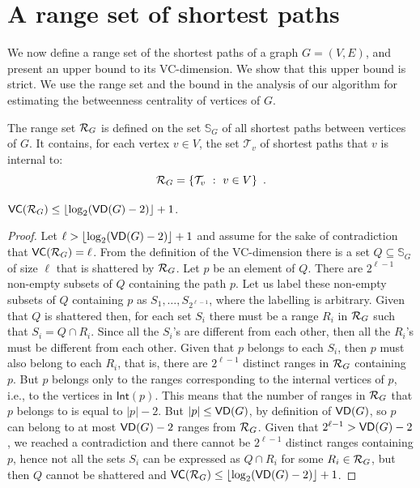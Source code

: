 \section{A range set of shortest paths}\label{sec:rangeset}
We now define a range set of the shortest paths of a graph $G=(V,E)$, and present 
an upper bound to its VC-dimension. We show that this upper bound is strict. We
use the range set and the bound in the analysis of our algorithm for estimating
the betweenness centrality of vertices of $G$.

The range set $\mathcal{R}_G$ is defined on the set $\mathbb{S}_G$ of all shortest
paths between vertices of $G$. It contains, for each vertex $v\in V$, the set
$\mathcal{T}_v$ of shortest paths that $v$ is internal to:
\[
\mathcal{R}_G = \{\mathcal{T}_v ~:~ v\in V\}\enspace.
\]

\begin{lemma}\label{lem:vcdimuppbound}
  $\mathsf{VC}(\mathcal{R}_G)\le\lfloor\log_2(\mathsf{VD}(G)-2)\rfloor+1$.
\end{lemma}

\begin{proof}
Let $\ell>\lfloor\log_2(\mathsf{VD}(G)-2)\rfloor+1$ and assume for the sake of contradiction
that $\mathsf{VC}(\mathcal{R}_G)=\ell$. From the definition of the VC-dimension there is a set
$Q\subseteq\mathbb{S}_G$ of size $\ell$ that is shattered by $\mathcal{R}_G$. Let $p$ be
an element of $Q$. There are  $2^{\ell-1}$ non-empty subsets of
$Q$ containing the path $p$. Let us label these non-empty subsets of $Q$ containing $p$ as
$S_1,\dotsc,S_{2^{\ell-1}}$, where the labelling is arbitrary.
Given that $Q$ is shattered then, for each set $S_i$ there must be a range $R_i$ in
$\mathcal{R}_G$ such that $S_i=Q\cap R_i$. Since all the $S_i$'s are
different from each other, then all the $R_i$'s must be different from each
other. Given that $p$ belongs to each $S_i$, then $p$ must also belong to each
$R_i$, that is, there are $2^{\ell-1}$ distinct ranges in $\mathcal{R}_G$ containing
$p$. But $p$ belongs only to the ranges corresponding to the internal vertices of
$p$, i.e., to the vertices in $\mathsf{Int}(p)$. This means that the number of ranges
in $\mathcal{R}_G$ that $p$ belongs to is equal to $|p|-2$. But $|p|\le\mathsf{VD}(G)$, by
definition of $\mathsf{VD}(G)$, so $p$
can belong to at most $\mathsf{VD}(G)-2$ ranges from $\mathcal{R}_G$. Given that
$2^{\ell-1}>\mathsf{VD}(G)-2$, we reached a contradiction and there cannot be $2^{\ell-1}$
distinct ranges containing $p$, hence not all the sets $S_i$ can be expressed as
$Q\cap R_i$ for some $R_i\in\mathcal{R}_G$, but then $Q$ cannot be shattered and
$\mathsf{VC}(\mathcal{R}_G)\le\lfloor\log_2(\mathsf{VD}(G)-2)\rfloor+1$.%
\end{proof}

